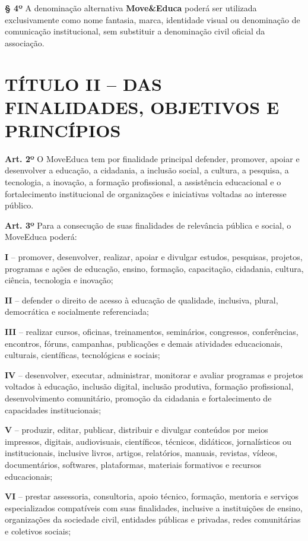 \documentclass[11pt,a4paper]{article}
\begin{document}
\textbf{§ 4º} A denominação alternativa \textbf{Move\&Educa} poderá ser utilizada exclusivamente como nome fantasia, marca, identidade visual ou denominação de comunicação institucional, sem substituir a denominação civil oficial da associação.

\section*{TÍTULO II -- DAS FINALIDADES, OBJETIVOS E PRINCÍPIOS}

\textbf{Art. 2º} O MoveEduca tem por finalidade principal defender, promover, apoiar e desenvolver a educação, a cidadania, a inclusão social, a cultura, a pesquisa, a tecnologia, a inovação, a formação profissional, a assistência educacional e o fortalecimento institucional de organizações e iniciativas voltadas ao interesse público.

\textbf{Art. 3º} Para a consecução de suas finalidades de relevância pública e social, o MoveEduca poderá:

\textbf{I} -- promover, desenvolver, realizar, apoiar e divulgar estudos, pesquisas, projetos, programas e ações de educação, ensino, formação, capacitação, cidadania, cultura, ciência, tecnologia e inovação;

\textbf{II} -- defender o direito de acesso à educação de qualidade, inclusiva, plural, democrática e socialmente referenciada;

\textbf{III} -- realizar cursos, oficinas, treinamentos, seminários, congressos, conferências, encontros, fóruns, campanhas, publicações e demais atividades educacionais, culturais, científicas, tecnológicas e sociais;

\textbf{IV} -- desenvolver, executar, administrar, monitorar e avaliar programas e projetos voltados à educação, inclusão digital, inclusão produtiva, formação profissional, desenvolvimento comunitário, promoção da cidadania e fortalecimento de capacidades institucionais;

\textbf{V} -- produzir, editar, publicar, distribuir e divulgar conteúdos por meios impressos, digitais, audiovisuais, científicos, técnicos, didáticos, jornalísticos ou institucionais, inclusive livros, artigos, relatórios, manuais, revistas, vídeos, documentários, softwares, plataformas, materiais formativos e recursos educacionais;

\textbf{VI} -- prestar assessoria, consultoria, apoio técnico, formação, mentoria e serviços especializados compatíveis com suas finalidades, inclusive a instituições de ensino, organizações da sociedade civil, entidades públicas e privadas, redes comunitárias e coletivos sociais;
\end{document}
